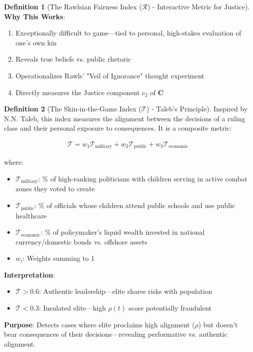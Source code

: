 \documentclass[11pt,a4paper]{article}
\theoremstyle{definition}
\newtheorem{definition}{Definition}[section]
\theoremstyle{remark}
\begin{document}
\begin{small}
\begin{definition}[The Rawlsian Fairness Index (\(\mathcal{R}\)) - Interactive Metric for Justice]
\textbf{Why This Works}: 
\begin{enumerate}
    \item Exceptionally difficult to game—tied to personal, high-stakes evaluation of one's own kin
    \item Reveals true beliefs vs. public rhetoric
    \item Operationalizes Rawls' "Veil of Ignorance" thought experiment
    \item Directly measures the Justice component \(c_2\) of \(\mathbf{C}\)
\end{enumerate}
\end{definition}

\begin{definition}[The Skin-in-the-Game Index (\(\mathcal{T}\)) - Taleb's Principle]
Inspired by N.N. Taleb, this index measures the alignment between the decisions of a ruling class and their personal exposure to consequences. It is a composite metric:

\begin{align}
\mathcal{T} = w_1 \mathcal{T}_{\text{military}} + w_2 \mathcal{T}_{\text{public}} + w_3 \mathcal{T}_{\text{economic}}
\end{align}

where:
\begin{itemize}
    \item \(\mathcal{T}_{\text{military}}\): \% of high-ranking politicians with children serving in active combat zones they voted to create
    \item \(\mathcal{T}_{\text{public}}\): \% of officials whose children attend public schools and use public healthcare
    \item \(\mathcal{T}_{\text{economic}}\): \% of policymaker's liquid wealth invested in national currency/domestic bonds vs. offshore assets
    \item \(w_i\): Weights summing to 1
\end{itemize}

\textbf{Interpretation}:
\begin{itemize}
    \item \(\mathcal{T} > 0.6\): Authentic leadership—elite shares risks with population
    \item \(\mathcal{T} < 0.3\): Insulated elite—high \(\rho(t)\) score potentially fraudulent
\end{itemize}

\textbf{Purpose}: Detects cases where elite proclaims high alignment (\(\rho\)) but doesn't bear consequences of their decisions—revealing performative vs. authentic alignment.
\end{definition}


\end{small}
\end{document}

